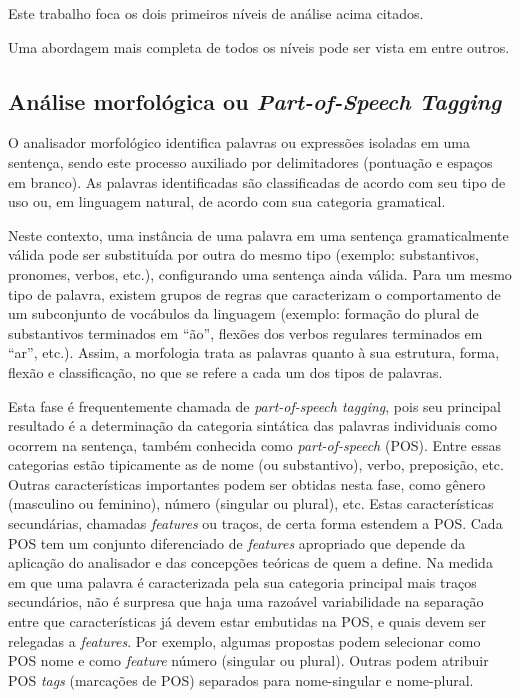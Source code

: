 Este trabalho foca os dois primeiros níveis de análise acima citados.

Uma abordagem mais completa de todos os níveis pode ser vista em \cite{allen95,vera01} entre outros.


\subsection{Análise morfológica ou \emph{Part-of-Speech Tagging}} %
\label{sub:analise_morfologica_ou_part_of_speech_tagging}

O analisador morfológico identifica palavras ou expressões isoladas em uma sentença, sendo este processo auxiliado por delimitadores (pontuação e espaços em branco). As palavras identificadas são classificadas de acordo com seu tipo de uso ou, em linguagem natural, de acordo com sua categoria gramatical.

Neste contexto, uma instância de uma palavra em uma sentença gramaticalmente válida pode ser substituída por outra do mesmo tipo (exemplo: substantivos, pronomes, verbos, etc.), configurando uma sentença ainda válida. Para um mesmo tipo de palavra, existem grupos de regras que caracterizam o comportamento de um subconjunto de vocábulos da linguagem (exemplo: formação do plural de substantivos terminados em ``ão'', flexões dos verbos regulares terminados em ``ar'', etc.). Assim, a morfologia trata as palavras quanto à sua estrutura, forma, flexão e classificação, no que se refere a cada um dos tipos de palavras.

Esta fase é frequentemente chamada de \emph{part-of-speech tagging}, pois seu principal resultado é a determinação da categoria sintática das palavras individuais como ocorrem na sentença, também conhecida como \emph{part-of-speech} (POS). Entre essas categorias estão tipicamente as de nome (ou substantivo), verbo, preposição, etc. Outras características importantes podem ser obtidas nesta fase, como gênero (masculino ou feminino), número (singular ou plural), etc. Estas características secundárias, chamadas \emph{features} ou traços, de certa forma estendem a POS. Cada POS tem um conjunto diferenciado de \emph{features} apropriado que depende da aplicação do analisador e das concepções teóricas de quem a define. Na medida em que uma palavra é caracterizada pela sua categoria principal mais traços secundários, não é surpresa que haja uma razoável variabilidade na separação entre que características já devem estar embutidas na POS, e quais devem ser relegadas a \emph{features}. Por exemplo, algumas propostas podem selecionar como POS nome e como \emph{feature} número (singular ou plural). Outras podem atribuir POS \emph{tags} (marcações de POS) separados para nome-singular e nome-plural.

